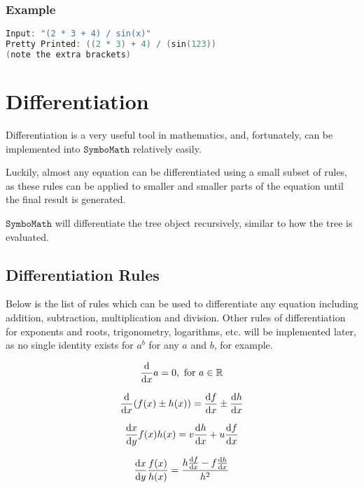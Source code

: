 \documentclass[12pt]{article}
\def\Symbo{{$\texttt{SymboMath}$}}
\begin{document}
\subsubsection{Example}

\begin{lstlisting}[language=C++]
Input: "(2 * 3 + 4) / sin(x)"
Pretty Printed: ((2 * 3) + 4) / (sin(123))
(note the extra brackets)
\end{lstlisting}

\pagebreak

\section{Differentiation}

Differentiation is a very useful tool in mathematics, and, fortunately, can be implemented into \Symbo{} relatively easily.

Luckily, almost any equation can be differentiated using a small subset of rules, as these rules can be applied to smaller and smaller parts of the equation until the final result is generated.

\Symbo{} will differentiate the tree object recursively, similar to how the tree is evaluated.

\subsection{Differentiation Rules}

Below is the list of rules which can be used to differentiate any equation including addition, subtraction, multiplication and division. Other rules of differentiation for exponents and roots, trigonometry, logarithms, etc. will be implemented later, as no single identity exists for $a^b$ for any $a$ and $b$, for example.

\iftrue
\begin{equation}
\dv{x}a = 0, \ \text{for} \ a \in \mathbb{R}
\end{equation}

\begin{equation}
\dv{x}(f(x) \pm h(x)) = \dv{f}{x} \pm \dv{h}{x}
\end{equation}

\begin{equation}
\dv{x}{y}f(x)h(x) = v \dv{h}{x} + u \dv{f}{x}
\end{equation}

\begin{equation}
\dv{x}{y}\frac{f(x)}{h(x)} = \frac{h \dv{f}{x} - f \dv{h}{x}}{h^2}
\end{equation}
\end{document}
